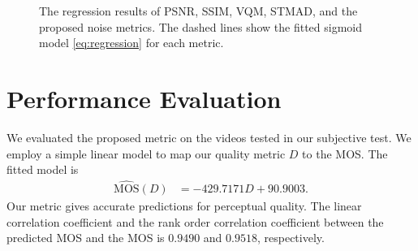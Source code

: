 \documentclass{sig-alternate}
\begin{document}
\begin{figure}
{}
\hspace*{1.7in}
\caption{\label{fig:fitting} The regression results of PSNR, SSIM, VQM, STMAD, and the proposed noise metrics. The dashed lines show the fitted sigmoid model \eqref{eq:regression} for each metric.}
\end{figure}


\section{Performance Evaluation}
\label{sec:experiment}
We evaluated the proposed metric on the videos tested in our subjective test. We employ a simple linear model to map our quality metric $D$ to the MOS. The fitted model is  
\begin{align*}
\label{eq:mos_mapping}
\mathrm{\hat{MOS}}(D) & = -429.7171D + 90.9003.
\end{align*}
Our metric gives accurate predictions for perceptual quality. The linear correlation coefficient and the rank order correlation coefficient between the predicted MOS and the MOS is $0.9490$ and $0.9518$, respectively.
\end{document}
